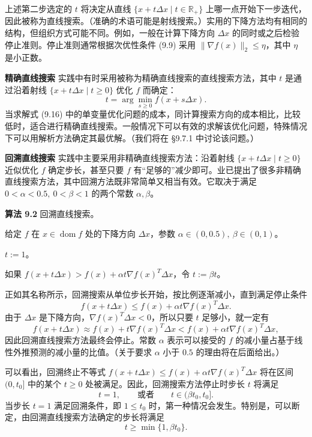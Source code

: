 \documentclass[UTF8,12pt,a4paper,fontset=fandol]{ctexart}
\begin{document}
上述第二步选定的 $t$ 将决定从直线 $\{x+t\Delta x\mid t\in\mathbb{R}_+\}$ 上哪一点开始下一步迭代，因此被称为直线搜索。（准确的术语可能是射线搜索。）实用的下降方法均有相同的结构，但组织方式可能不同。例如，一般在计算下降方向 $\Delta x$ 的同时或之后检验停止准则。停止准则通常根据次优性条件 (9.9) 采用 $\|\nabla f(x)\|_2\leq\eta$，其中 $\eta$ 是小正数。

\noindent\textbf{精确直线搜索}\quad
实践中有时采用被称为精确直线搜索的直线搜索方法，其中 $t$ 是通过沿着射线 $\{x+t\Delta x\mid t\geq0\}$ 优化 $f$ 而确定：
\begin{equation}
t=\arg\min_{s\geq0} f(x+s\Delta x).
\tag{9.16}
\end{equation}
当求解式 (9.16) 中的单变量优化问题的成本，同计算搜索方向的成本相比，比较低时，适合进行精确直线搜索。一般情况下可以有效的求解该优化问题，特殊情况下可以用解析方法确定其最优解。（我们将在 \S9.7.1 中讨论该问题。）

\noindent\textbf{回溯直线搜索}\quad
实践中主要采用非精确直线搜索方法：沿着射线 $\{x+t\Delta x\mid t\geq0\}$ 近似优化 $f$ 确定步长，甚至只要 $f$ 有“足够的”减少即可。业已提出了很多非精确直线搜索方法，其中回溯方法既非常简单又相当有效。它取决于满足 $0<\alpha<0.5,\ 0<\beta<1$ 的两个常数 $\alpha,\beta$。

\noindent\textbf{算法 9.2}\quad
回溯直线搜索。

给定 $f$ 在 $x\in\operatorname{dom} f$ 处的下降方向 $\Delta x$，参数 $\alpha\in(0,0.5),\ \beta\in(0,1)$。

$t:=1$。

如果 $f(x+t\Delta x)>f(x)+\alpha t\nabla f(x)^T\Delta x$，令 $t:=\beta t$。

正如其名称所示，回溯搜索从单位步长开始，按比例逐渐减小，直到满足停止条件
\[
f(x+t\Delta x)\leq f(x)+\alpha t\nabla f(x)^T\Delta x.
\]
由于 $\Delta x$ 是下降方向，$\nabla f(x)^T\Delta x<0$，所以只要 $t$ 足够小，就一定有
\[
f(x+t\Delta x)\approx f(x)+t\nabla f(x)^T\Delta x<f(x)+\alpha t\nabla f(x)^T\Delta x,
\]
因此回溯直线搜索方法最终会停止。常数 $\alpha$ 表示可以接受的 $f$ 的减小量占基于线性外推预测的减小量的比值。（关于要求 $\alpha$ 小于 $0.5$ 的理由将在后面给出。）

可以看出，回溯终止不等式 $f(x+t\Delta x)\leq f(x)+\alpha t\nabla f(x)^T\Delta x$ 将在区间 $(0,t_0]$ 中的某个 $t\geq0$ 处被满足。因此，回溯搜索方法停止时步长 $t$ 将满足
\[
t=1,\qquad \text{或者}\qquad t\in(\beta t_0,t_0].
\]
当步长 $t=1$ 满足回溯条件，即 $1\leq t_0$ 时，第一种情况会发生。特别是，可以断定，由回溯直线搜索方法确定的步长将满足
\[
t\geq\min\{1,\beta t_0\}.
\]
\end{document}
